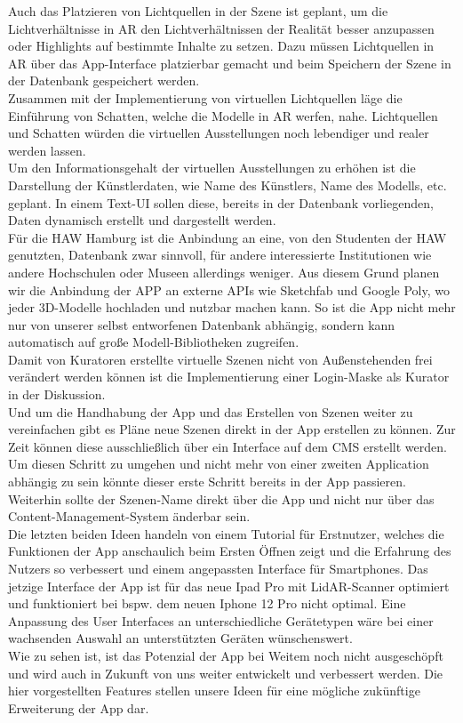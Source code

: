 \documentclass[12pt,a4paper]{article}
\begin{document}
Auch das Platzieren von Lichtquellen in der Szene ist geplant, um die Lichtverhältnisse in AR den Lichtverhältnissen der Realität besser anzupassen oder Highlights auf bestimmte Inhalte zu setzen. Dazu müssen Lichtquellen in AR über das App-Interface platzierbar gemacht und beim Speichern der Szene in der Datenbank gespeichert werden.\\
Zusammen mit der Implementierung von virtuellen Lichtquellen läge die Einführung von Schatten, welche die Modelle in AR werfen, nahe. Lichtquellen und Schatten würden die virtuellen Ausstellungen noch lebendiger und realer werden lassen.\\
Um den Informationsgehalt der virtuellen Ausstellungen zu erhöhen ist die Darstellung der Künstlerdaten, wie Name des Künstlers, Name des Modells, etc. geplant. In einem Text-UI sollen diese, bereits in der Datenbank vorliegenden, Daten dynamisch erstellt und dargestellt werden.\\
Für die HAW Hamburg ist die Anbindung an eine, von den Studenten der HAW genutzten, Datenbank zwar sinnvoll, für andere interessierte Institutionen wie andere Hochschulen oder Museen allerdings weniger. Aus diesem Grund planen wir die Anbindung der APP an externe APIs wie Sketchfab und Google Poly, wo jeder 3D-Modelle hochladen und nutzbar machen kann. So ist die App nicht mehr nur von unserer selbst entworfenen Datenbank abhängig, sondern kann automatisch auf große Modell-Bibliotheken zugreifen.\\
Damit von Kuratoren erstellte virtuelle Szenen nicht von Außenstehenden frei verändert werden können ist die Implementierung einer Login-Maske als Kurator in der Diskussion.\\
Und um die Handhabung der App und das Erstellen von Szenen weiter zu vereinfachen gibt es Pläne neue Szenen direkt in der App erstellen zu können. Zur Zeit können diese ausschließlich über ein Interface auf dem CMS erstellt werden. Um diesen Schritt zu umgehen und nicht mehr von einer zweiten Application abhängig zu sein könnte dieser erste Schritt bereits in der App passieren. Weiterhin sollte der Szenen-Name direkt über die App und nicht nur über das Content-Management-System änderbar sein.\\
Die letzten beiden Ideen handeln von einem Tutorial für Erstnutzer, welches die Funktionen der App anschaulich beim Ersten Öffnen zeigt und die Erfahrung des Nutzers so verbessert und einem angepassten Interface für Smartphones. Das jetzige Interface der App ist für das neue Ipad Pro mit LidAR-Scanner optimiert und funktioniert bei bspw. dem neuen Iphone 12 Pro nicht optimal. Eine Anpassung des User Interfaces an unterschiedliche Gerätetypen wäre bei einer wachsenden Auswahl an unterstützten Geräten wünschenswert.\\

Wie zu sehen ist, ist das Potenzial der App bei Weitem noch nicht ausgeschöpft und wird auch in Zukunft von uns weiter entwickelt und verbessert werden. Die hier vorgestellten Features stellen unsere Ideen für eine mögliche zukünftige Erweiterung der App dar.



\end{document}
